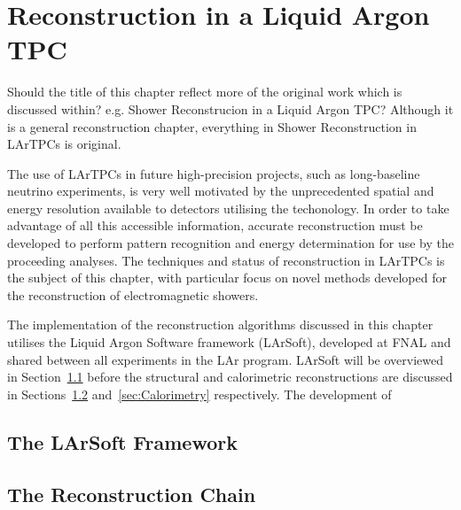 
\chapter{Reconstruction in a Liquid Argon TPC}\label{chap:LArTPCReconstruction}

{\color{red} Should the title of this chapter reflect more of the original work which is discussed within?  e.g. Shower Reconstrucion in a Liquid Argon TPC?  Although  it is a general reconstruction chapter, everything in Shower Reconstruction in LArTPCs is original.}

The use of LArTPCs in future high-precision projects, such as long-baseline neutrino experiments, is very well motivated by the unprecedented spatial and energy resolution available to detectors utilising the techonology.  In order to take advantage of all this accessible information, accurate reconstruction must be developed to perform pattern recognition and energy determination for use by the proceeding analyses.  The techniques and status of reconstruction in LArTPCs is the subject of this chapter, with particular focus on novel methods developed for the reconstruction of electromagnetic showers.

The implementation of the reconstruction algorithms discussed in this chapter utilises the Liquid Argon Software framework (LArSoft), developed at FNAL and shared between all experiments in the LAr program.  LArSoft will be overviewed in Section~\ref{sec:LArSoft} before the structural and calorimetric reconstructions are discussed in Sections~\ref{sec:ReconstructionChain} and~\ref{sec:Calorimetry} respectively.  The development of 

\section{The LArSoft Framework}\label{sec:LArSoft}

\section{The Reconstruction Chain}\label{sec:ReconstructionChain}

